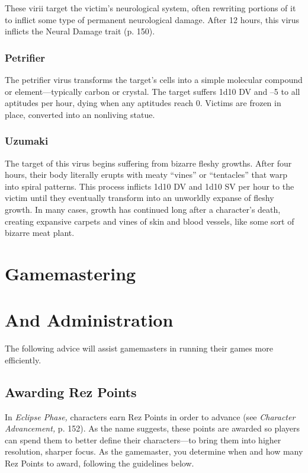 These virii target the victim's neurological system, 
often rewriting portions of it to inflict some type of 
permanent neurological damage. After 12 hours, this 
virus inflicts the Neural Damage trait (p. 150).

\subsubsection{Petrifier}

The petrifier virus transforms the target's cells into 
a simple molecular compound or element—typically 
carbon or crystal. The target suffers 1d10 DV and –5 
to all aptitudes per hour, dying when any aptitudes 
reach 0. Victims are frozen in place, converted into an 
nonliving statue.

\subsubsection{Uzumaki}

The target of this virus begins suffering from bizarre 
fleshy growths. After four hours, their body literally 
erupts with meaty ``vines'' or ``tentacles'' that warp 
into spiral patterns. This process inflicts 1d10 DV and 
1d10 SV per hour to the victim until they eventually 
transform into an unworldly expanse of fleshy growth. 
In many cases, growth has continued long after a 
character's death, creating expansive carpets and vines 
of skin and blood vessels, like some sort of bizarre 
meat plant.

\section{Gamemastering}


\section{And Administration }

The following advice will assist gamemasters in running
their games more efficiently.

\subsection{Awarding Rez Points }

In \textit{Eclipse Phase,} characters earn Rez Points in order 
to advance (see \textit{Character Advancement,} p. 152). As 
the name suggests, these points are awarded so players 
can spend them to better define their characters—to 
bring them into higher resolution, sharper focus. As 
the gamemaster, you determine when and how many 
Rez Points to award, following the guidelines below.

